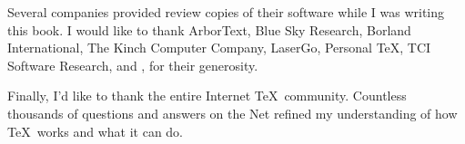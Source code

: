 Several companies provided review copies of their software while I was writing
this book.  I would like to thank ArborText, Blue Sky Research, Borland
International, The Kinch Computer Company, LaserGo, Personal \TeX, TCI
Software Research, and \YY, for their generosity.

Finally, I'd like to thank the entire Internet \TeX\ community.  Countless
thousands of questions and answers on the Net refined my understanding of how
\TeX\ works and what it can do.
